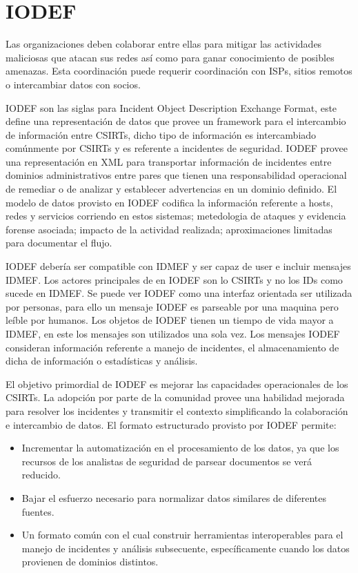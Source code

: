 \section{IODEF}

Las organizaciones deben colaborar entre ellas para mitigar las actividades 
maliciosas que atacan sus redes así como para ganar conocimiento de posibles 
amenazas. Esta coordinación puede requerir coordinación con ISPs, sitios remotos 
o intercambiar datos con socios.

IODEF son las siglas para Incident Object Description Exchange Format, este 
define una representación de datos que provee un framework para el intercambio 
de información entre CSIRTs, dicho tipo de información es intercambiado 
comúnmente por CSIRTs y es referente a incidentes de seguridad. IODEF provee una 
representación en XML para transportar información de incidentes entre dominios 
administrativos entre pares que tienen una responsabilidad operacional de 
remediar o de analizar y establecer advertencias en un dominio definido. El 
modelo de datos provisto en IODEF codifica la información referente a hosts, 
redes y servicios corriendo en estos sistemas; metedologia de ataques y 
evidencia forense asociada; impacto de la actividad realizada; aproximaciones 
limitadas para documentar el flujo.

IODEF debería ser compatible con IDMEF y ser capaz de user e incluir mensajes 
IDMEF. Los actores principales de en IODEF son lo CSIRTs y no los IDs como 
sucede en IDMEF. Se puede ver IODEF como una interfaz orientada ser utilizada 
por personas, para ello un mensaje IODEF es parseable por una maquina pero 
leíble por humanos. Los objetos de IODEF tienen un tiempo de vida mayor a IDMEF, 
en este los mensajes son utilizados una sola vez. Los mensajes IODEF consideran 
información referente a manejo de incidentes, el almacenamiento de dicha de 
información o estadísticas y análisis.

El objetivo primordial de IODEF es mejorar las capacidades operacionales de los 
CSIRTs. La adopción por parte de la comunidad provee una habilidad mejorada para 
resolver los incidentes y transmitir el contexto  simplificando la colaboración 
e intercambio de datos. El formato estructurado provisto por IODEF permite:
\begin{itemize}
  \item Incrementar la automatización en el procesamiento de los datos, ya que 
  los recursos de los analistas de seguridad de parsear documentos se verá 
  reducido.
  \item Bajar el esfuerzo necesario para normalizar datos similares de 
  diferentes fuentes.
  \item Un formato común con el cual construir herramientas interoperables para 
  el manejo de incidentes y análisis subsecuente, específicamente cuando los 
  datos provienen de dominios distintos.
\end{itemize}

